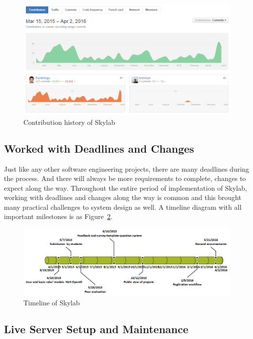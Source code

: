 \begin{figure}[h]
  \centering
  \includegraphics[width=\textwidth]{Images/Skylab_Contribution.png}
  \caption{Contribution history of Skylab}
  \label{fig:SkylabContribution}
\end{figure}

\subsection{Worked with Deadlines and Changes}

Just like any other software engineering projects, there are many deadlines during the process. And there will always be more requirements to complete, changes to expect along the way. Throughout the entire period of implementation of Skylab, working with deadlines and changes along the way is common and this brought many practical challenges to system design as well. A timeline diagram with all important milestones is as Figure~\ref{fig:SkylabTimeline}.

\begin{figure}[h]
  \centering
  \includegraphics[width=\textwidth]{Images/Skylab_Timeline.png}
  \caption{Timeline of Skylab}
  \label{fig:SkylabTimeline}
\end{figure}

\subsection{Live Server Setup and Maintenance}

